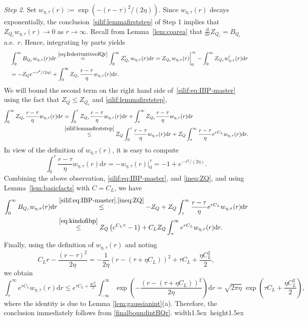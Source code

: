 \documentclass[11pt,letterpaper]{article}
\newcommand{\nn}{\nonumber}
\newcommand{\D}{\mathrm{d}}
\newcommand*{\QEDA}{\hfill\hbox{\vrule width1.5ex height1.5ex}}
\begin{document}
\emph{Step 2.} Set $w_{\eta,\tau}(r):=\exp \left(-(r-\tau)^2/(2\eta)\right)$.
Since $w_{\eta,\tau}(r)$ decays exponentially, the conclusion~\eqref{silif:lemmafirststep} of Step 1 implies that $Z_{Q_r}w_{\eta,\tau}(r)\to0$ as $r\to\infty$.
Recall from Lemma~\ref{lem:coarea} that
$\frac{\D}{\D r}Z_{Q_r}=B_{Q_r}$ a.e.\ $r$.
Hence, integrating by parts yields
\begin{align}\label{silif:eq:IBP-master}
&\int_{0}^{\infty} B_{Q_r}   w_{\eta,\tau}(r)  \D r
\stackrel{\eqref{eq:IrderivativeofQr}}=\int_{0}^{\infty} Z_{Q_r}'   w_{\eta,\tau}(r)  \D r
= Z_{Q_r}w_{\eta,\tau}(r)\bigg|_{0}^{\infty}
-\int_{0}^{\infty} Z_{Q_r}   w_{\eta,\tau}'(r)  \D r\nonumber\\
\quad&= -Z_Q e^{-\tau^2/(2\eta)}
+ \int_{0}^{\infty} Z_{Q_r}  \frac{r-\tau}{\eta}  w_{\eta,\tau}(r)  \D r. 
\end{align}
We will bound the second term on the right hand side of~\eqref{silif:eq:IBP-master} using the fact that $Z_Q\leq Z_{Q_r}$ and \eqref{silif:lemmafirststep},  
\begin{align}
    \int_{0}^{\infty} Z_{Q_r}  \frac{r-\tau}{\eta}  w_{\eta,\tau}(r)  \D r &= \int_0^\tau Z_{Q_r}  \frac{r-\tau}{\eta}  w_{\eta,\tau}(r)  \D r + \int_\tau^\infty Z_{Q_r}  \frac{r-\tau}{\eta}  w_{\eta,\tau}(r)  \D r \nn \\
    &\stackrel{\eqref{silif:lemmafirststep}}\leq Z_Q\int_0^\tau \frac{r-\tau}{\eta}    w_{\eta,\tau}(r)  \D r+ Z_Q\int_\tau^\infty \frac{r-\tau}{\eta}  e^{rC_L}  w_{\eta,\tau}(r)  \D r.\label{ineq:ZQ}
\end{align}
In view of the definition of $w_{\eta,\tau}(r)$, it is easy to compute
\[
\int_0^\tau \frac{r-\tau}{\eta}    w_{\eta,\tau}(r) \D r = - w_{\eta,\tau}(r) \bigg|_{0}^{\tau} 
    = - 1 + e^{-\tau^2/(2\eta)}.
\]
Combining the above observation, \eqref{silif:eq:IBP-master}, and \eqref{ineq:ZQ}, and using Lemma~\ref{lem:basicfacts} with $C=C_L$, we have
\begin{align}
     \int_{0}^{\infty} B_{Q_r}   w_{\eta,\tau}(r)  \D r & \stackrel{\eqref{silif:eq:IBP-master},\eqref{ineq:ZQ}}\leq -Z_Q + Z_Q\int_\tau^\infty \frac{r-\tau}{\eta}  e^{rC_L}  w_{\eta,\tau}(r)  \D r \nn \\
     &\stackrel{\eqref{eq:kindofibp}} \le Z_Q\left(e^{C_L\tau}-1\right)+C_L Z_Q\int_{\tau}^{\infty} e^{rC_L}w_{\eta,\tau}(r)  \D r. \label{finalboundintBQr}
\end{align}
Finally, using the definition of $w_{\eta,\tau}(r)$ and noting 
\[
C_L r-\frac{(r-\tau)^2}{2\eta}
=-\frac{1}{2\eta}\left(r-(\tau+\eta C_L)\right)^2+\tau C_L+\frac{\eta C_L^2}{2},
\]
we obtain 
\[
\int_{\tau}^{\infty} e^{rC_L}w_{\eta,\tau}(r)  \D r
\le e^{\tau C_L+\frac{\eta C_L^2}{2}}
\int_{-\infty}^{\infty}\exp \left(-\frac{(r-(\tau+\eta C_L))^2}{2\eta}\right)  \D r=\sqrt{2\pi\eta}\;\exp \left(\tau C_L+\frac{\eta C_L^2}{2}\right),
\] 
where the identity is due to Lemma \ref{lem:gaussianint}(a).
Therefore, the conclusion immediately follows from \eqref{finalboundintBQr}.
\QEDA
\end{document}

